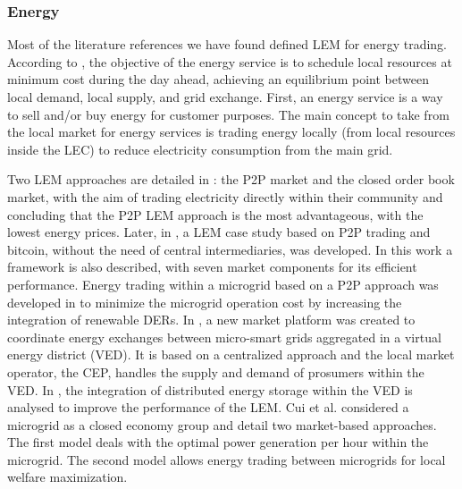 \subsubsection{Energy}
Most of the literature references we have found defined LEM for energy trading. According to \cite{ilieva2016design}, the objective of the energy service is to schedule local resources at minimum cost during the day ahead, achieving an equilibrium point between local demand, local supply, and grid exchange. First, an energy service is a way to sell and/or buy energy for customer purposes. The main concept to take from the local market for energy services is trading energy locally (from local resources inside the LEC) to reduce electricity consumption from the main grid.

Two LEM approaches are detailed in \cite{mengelkamp2018blockchain}: the P2P market and the closed order book market, with the aim of trading electricity directly within their community and concluding that the P2P LEM approach is the most advantageous, with the lowest energy prices. Later, in \cite{mengelkamp2017role}, a LEM case study based on P2P trading and bitcoin, without the need of central intermediaries, was developed. In this work a framework is also described, with seven market components for its efficient performance. Energy trading within a microgrid based on a P2P approach was developed in \cite{luo2014autonomous} to minimize the microgrid operation cost by increasing the integration of renewable DERs. In \cite{menniti2014future}, a new market platform was created to coordinate energy exchanges between micro-smart grids aggregated in a virtual energy district (VED). It is based on a centralized approach and the local market operator, the CEP, handles the supply and demand of prosumers within the VED. In \cite{Menniti2015}, the integration of distributed energy storage within the VED is analysed to improve the performance of the LEM.
Cui et al. \cite{cui2014electricity} considered a microgrid as a closed economy group and detail two market-based approaches. The first model deals with the optimal power generation per hour within the microgrid. The second model allows energy trading between microgrids for local welfare maximization.

